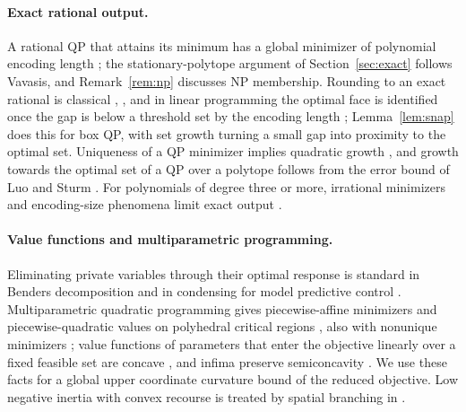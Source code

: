 \paragraph{Exact rational output.}
A rational QP that attains its minimum has a global minimizer of polynomial
encoding length \cite{Vavasis1990,DelPiaDeyMolinaro2017}; the
stationary-polytope argument of Section~\ref{sec:exact} follows Vavasis, and
Remark~\ref{rem:np} discusses NP membership. Rounding to an exact rational is classical
\cite[Section~5.1]{GrotschelLovaszSchrijver1988},
\cite{KozlovTarasovKhachiyan1980}, and in linear programming the optimal face
is identified once the gap is below a threshold set by the encoding length
\cite{Ye1992,MehrotraYe1993}; Lemma~\ref{lem:snap} does this for box QP, with
set growth turning a small gap into proximity to the optimal set. Uniqueness
of a QP minimizer implies quadratic growth \cite{Contesse1980}, and growth
towards the optimal set of a QP over a polytope follows from the error bound
of Luo and Sturm \cite[Theorem~3.3]{LuoSturm2000}. For polynomials of degree
three or more, irrational minimizers and encoding-size phenomena limit exact
output \cite{BienstockDelPiaHildebrand2023}.

\paragraph{Value functions and multiparametric programming.}
Eliminating private variables through their optimal response is standard in
Benders decomposition \cite{Benders1962,Geoffrion1972} and in condensing for
model predictive control
\cite{BockPlitt1984,JerezKerriganConstantinides2012,Axehill2015}.
Multiparametric quadratic programming gives piecewise-affine minimizers and
piecewise-quadratic values on polyhedral critical regions
\cite{BemporadEtAl2002,TondelJohansenBemporad2003}, also with nonunique
minimizers \cite{SpjotvoldTondelJohansen2007,PatrinosSarimveis2011}; value
functions of parameters that enter the objective linearly over a fixed
feasible set are
concave \cite{MangasarianRosen1964,FiaccoKyparisis1986}, and infima preserve
semiconcavity \cite{CannarsaSinestrari2004}. We use these facts for a global
upper coordinate curvature bound of the reduced objective. Low negative
inertia with convex recourse is treated by spatial branching in
\cite{Vavasis1992,LuoBaiLimPeng2019}.

